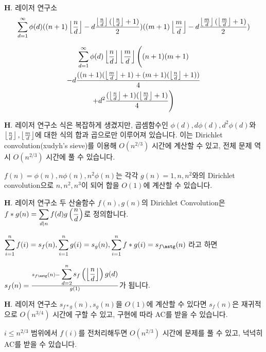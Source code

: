 \begin{frame}{\textbf{H}. 레이저 연구소}
    $$\displaystyle \sum_{d=1}^{\infty} \phi(d)((n+1)\left\lfloor{n \over d}\right\rfloor-d{\left\lfloor{n \over d}\right\rfloor(\left\lfloor{n \over d}\right\rfloor+1) \over 2})((m+1)\left\lfloor{m \over d}\right\rfloor-d{\left\lfloor{m \over d}\right\rfloor(\left\lfloor{m \over d}\right\rfloor+1) \over 2})$$

    \vspace{18pt}
    
    \begin{multline}
    \displaystyle \sum_{d=1}^{\infty} \phi(d)\left\lfloor{n \over d}\right\rfloor\left\lfloor{m \over d}\right\rfloor \Bigg( (n+1)(m+1) \\
    -d{( (n+1)(\left\lfloor{m \over d}\right\rfloor+1) + (m+1)(\left\lfloor{n \over d}\right\rfloor+1) ) \over 4} \\
    +d^{2}{(\left\lfloor{n \over d}\right\rfloor+1)(\left\lfloor{m \over d}\right\rfloor+1) \over 4} \Bigg) 
    \end{multline}

\end{frame}
    
\begin{frame}{\textbf{H}. 레이저 연구소}
    식은 복잡하게 생겼지만, 곱셈함수인 $\phi(d), d\phi(d), d^{2}\phi(d)$와 $\left\lfloor{n \over d}\right\rfloor, \left\lfloor{m \over d}\right\rfloor$에 대한 식의 합과 곱으로만 이루어져 있습니다. 이는 Dirichlet convolution(xudyh's sieve)를 이용해 $O(n^{2/3})$ 시간에 계산할 수 있고, 전체 문제 역시 $O(n^{2/3})$ 시간에 풀 수 있습니다.
    
    \vspace{18pt}
    
    $f(n) = \phi(n), n\phi(n), n^{2}\phi(n)$는 각각 $g(n) = 1, n, n^2$와의 Dirichlet convolution으로 $n, n^2, n^3$이 되어 합을 $O(1)$에 계산할 수 있습니다.

\end{frame}    

\begin{frame}{\textbf{H}. 레이저 연구소}
    두 산술함수 $f(n), g(n)$의 Dirichlet Convolution은 $f\ast g(n) = \displaystyle \sum_{d \vert n} f(d)g\left({n\over d}\right)$로 정의합니다.
    
    \vspace{18pt}
    
    $\displaystyle \sum_{i=1}^{n} f(i) = s_{f}(n), \displaystyle \sum_{i=1}^{n} g(i) = s_{g}(n), \displaystyle \sum_{i=1}^{n} f\ast g(i) = s_{f\astg}(n)$ 라고 하면

    \vspace{18pt}
    
    $s_{f}(n) = {{s_{f\astg}(n)-\displaystyle \sum_{d=2}^{n} s_{f}\left(\left\lfloor{n \over d}\right\rfloor\right)g(d)} \over {g(1)}}$가 됩니다.
\end{frame}

\begin{frame}{\textbf{H}. 레이저 연구소}
    $s_{f\ast g}(n), s_{g}(n)$을 $O(1)$에 계산할 수 있다면 $s_{f}(n)$은 재귀적으로 $O(n^{3/4})$ 시간에 구할 수 있고, 구현에 따라 AC를 받을 수 있습니다.
    
    $i \leq n^{2/3}$ 범위에서 $f(i)$를 전처리해두면 $O(n^{2/3})$ 시간에 문제를 풀 수 있고, 넉넉히 AC를 받을 수 있습니다.
\end{frame}